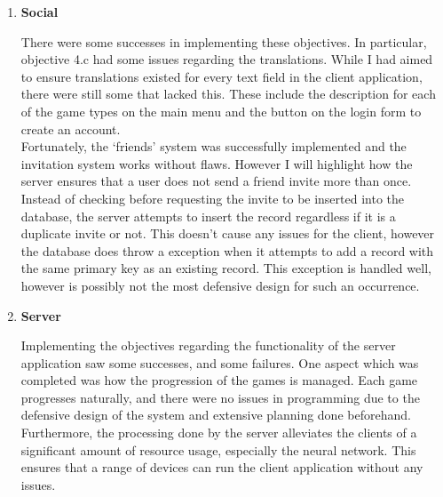 \documentclass{article}
\begin{document}
\begin{enumerate}
    The objectives for the user's statistics were completely met, however there were some challenges implementing objective 3.a.i. Separating the statistics for each letter required configuring a Windows Forms panel for each letter using an iteration structure. I had some issues adding scrollbars to the parent panel which the 26 sub-panels were added to. Ultimately the issue came down to how Windows Forms draws new controls in, and calling the `SuspendLayout()' method had some odd quirks which had to be dealt with. \\

    Regarding the `about me' attribute of a user, this was implemented without much reason other than user experience since it is a common feature in other applications. However this is not viewable to other users since a panel to display it was not added to the `Profile' page.
    
    \item \textbf{Social}
    
    There were some successes in implementing these objectives. In particular, objective 4.c had some issues regarding the translations. While I had aimed to ensure translations existed for every text field in the client application, there were still some that lacked this. These include the description for each of the game types on the main menu and the button on the login form to create an account. \\

    Fortunately, the `friends' system was successfully implemented and the invitation system works without flaws. However I will highlight how the server ensures that a user does not send a friend invite more than once. Instead of checking before requesting the invite to be inserted into the database, the server attempts to insert the record regardless if it is a duplicate invite or not. This doesn't cause any issues for the client, however the database does throw a exception when it attempts to add a record with the same primary key as an existing record. This exception is handled well, however is possibly not the most defensive design for such an occurrence. \\ 

    \item \textbf{Server}

    Implementing the objectives regarding the functionality of the server application saw some successes, and some failures. One aspect which was completed was how the progression of the games is managed. Each game progresses naturally, and there were no issues in programming due to the defensive design of the system and extensive planning done beforehand. Furthermore, the processing done by the server alleviates the clients of a significant amount of resource usage, especially the neural network. This ensures that a range of devices can run the client application without any issues. \\


\end{enumerate}
\end{document}
